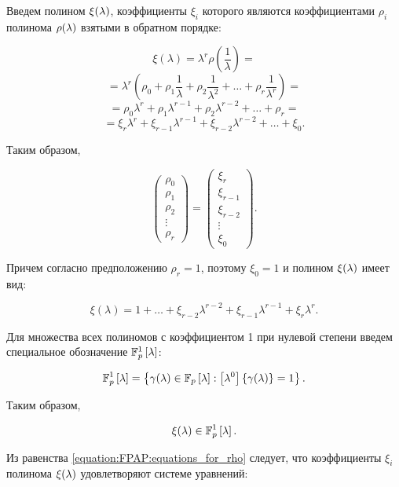 Введем полином $\xi (\lambda)$, коэффициенты $\xi_i$ которого являются коэффициентами $\rho_i$ полинома $\rho (\lambda)$ взятыми
в обратном порядке:

	$$ \xi(\lambda) = \lambda^r \rho \left ( \frac{1}{\lambda} \right ) = $$
	$$ = \lambda^r \left ( \rho_0 + \rho_1 \frac{1}{\lambda} + \rho_2 \frac{1}{\lambda^2} + \dots + \rho_r \frac{1}{\lambda^r} \right ) = $$
	$$ = \rho_0 \lambda^r + \rho_1 \lambda^{r-1} + \rho_2 \lambda^{r-2} + \dots + \rho_r = $$
	$$ = \xi_r \lambda^r + \xi_{r-1} \lambda^{r-1} + \xi_{r-2} \lambda^{r-2} + \dots + \xi_0. $$

Таким образом,

	\begin{equation} \label{equation:FPAP:rho_and_xi_equation}
		\begin{pmatrix}
			\rho_0 \\
			\rho_1 \\
			\rho_2 \\
			\vdots \\
			\rho_r
		\end{pmatrix}
		=
		\begin{pmatrix}
			\xi_r \\
			\xi_{r-1} \\
			\xi_{r-2} \\
			\vdots \\
			\xi_0
		\end{pmatrix}
		.
	\end{equation}

Причем согласно предположению $\rho_r = 1$, поэтому $\xi_0 = 1$ и полином $\xi (\lambda)$ имеет вид:

	$$ \xi(\lambda) = 1 + \dots + \xi_{r-2} \lambda^{r-2} + \xi_{r-1} \lambda^{r-1} + \xi_r \lambda^r. $$

Для множества всех полиномов с коэффициентом 1 при нулевой степени введем специальное обозначение $\mathbb{F}_p^1 \left [ \lambda \right ]$:

	$$ \mathbb{F}_p^1 \left [ \lambda \right ] = \left \{ \gamma (\lambda) \in \mathbb{F}_p \left [ \lambda \right ] : \left [ \lambda^{0} \right ] \left \{ \gamma (\lambda) \right \} = 1 \right \}. $$

Таким образом,

	$$ \xi (\lambda) \in \mathbb{F}_p^1 \left [ \lambda \right ]. $$

Из равенства \eqref{equation:FPAP:equations_for_rho} следует, что коэффициенты $\xi_i$ полинома $\xi (\lambda)$ удовлетворяют
системе уравнений:

